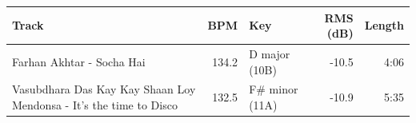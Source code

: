 \begin{tabularx}{\linewidth}{@{}Xrlrr@{}}\toprule
Track & BPM & Key & RMS (dB) & Length \\\midrule
Farhan Akhtar - Socha Hai & 134.2 & D major (10B) & -10.5 & 4:06 \\
Vasubdhara Das Kay Kay Shaan Loy Mendonsa - It's the time to Disco & 132.5 & F\# minor (11A) & -10.9 & 5:35 \\
\bottomrule\end{tabularx}
